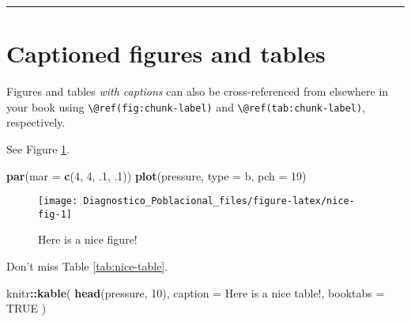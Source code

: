 \documentclass[
]{book}
\newenvironment{Shaded}{\begin{snugshade}}{\end{snugshade}}
\newcommand{\AttributeTok}[1]{\textcolor[rgb]{0.13,0.29,0.53}{#1}}
\newcommand{\ConstantTok}[1]{\textcolor[rgb]{0.56,0.35,0.01}{#1}}
\newcommand{\DecValTok}[1]{\textcolor[rgb]{0.00,0.00,0.81}{#1}}
\newcommand{\FunctionTok}[1]{\textcolor[rgb]{0.13,0.29,0.53}{\textbf{#1}}}
\newcommand{\NormalTok}[1]{#1}
\newcommand{\SpecialCharTok}[1]{\textcolor[rgb]{0.81,0.36,0.00}{\textbf{#1}}}
\newcommand{\StringTok}[1]{\textcolor[rgb]{0.31,0.60,0.02}{#1}}
\theoremstyle{definition}
\theoremstyle{definition}
\theoremstyle{definition}
\theoremstyle{definition}
\theoremstyle{remark}
\begin{document}
\begin{center}\rule{0.5\linewidth}{0.5pt}\end{center}

\hypertarget{captioned-figures-and-tables}{%
\section{Captioned figures and tables}\label{captioned-figures-and-tables}}

Figures and tables \emph{with captions} can also be cross-referenced from elsewhere in your book using \texttt{\textbackslash{}@ref(fig:chunk-label)} and \texttt{\textbackslash{}@ref(tab:chunk-label)}, respectively.

See Figure \ref{fig:nice-fig}.

\begin{Shaded}
\begin{Highlighting}[]
\FunctionTok{par}\NormalTok{(}\AttributeTok{mar =} \FunctionTok{c}\NormalTok{(}\DecValTok{4}\NormalTok{, }\DecValTok{4}\NormalTok{, .}\DecValTok{1}\NormalTok{, .}\DecValTok{1}\NormalTok{))}
\FunctionTok{plot}\NormalTok{(pressure, }\AttributeTok{type =} \StringTok{\textquotesingle{}b\textquotesingle{}}\NormalTok{, }\AttributeTok{pch =} \DecValTok{19}\NormalTok{)}
\end{Highlighting}
\end{Shaded}

\begin{figure}

{\centering \texttt{[image: Diagnostico\_Poblacional\_files/figure-latex/nice-fig-1]} 

}

\caption{Here is a nice figure!}\label{fig:nice-fig}
\end{figure}

Don't miss Table \ref{tab:nice-table}.

\begin{Shaded}
\begin{Highlighting}[]
\NormalTok{knitr}\SpecialCharTok{::}\FunctionTok{kable}\NormalTok{(}
  \FunctionTok{head}\NormalTok{(pressure, }\DecValTok{10}\NormalTok{), }\AttributeTok{caption =} \StringTok{\textquotesingle{}Here is a nice table!\textquotesingle{}}\NormalTok{,}
  \AttributeTok{booktabs =} \ConstantTok{TRUE}
\NormalTok{)}
\end{Highlighting}
\end{Shaded}
\end{document}
